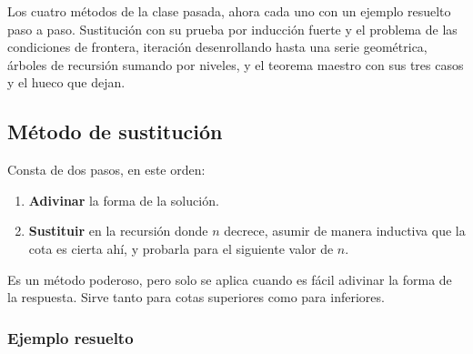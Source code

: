 \documentclass[11pt,letterpaper]{article}
\begin{document}
\newpage



\begin{quick_sum}
  Los cuatro métodos de la clase pasada, ahora cada uno con un ejemplo
  resuelto paso a paso. Sustitución con su prueba por inducción fuerte
  y el problema de las condiciones de frontera, iteración desenrollando
  hasta una serie geométrica, árboles de recursión sumando por niveles,
  y el teorema maestro con sus tres casos y el hueco que dejan.
\end{quick_sum}


\subsection*{Método de sustitución}

Consta de dos pasos, en este orden:

\begin{enumerate}[itemsep=0.2em]
  \item \textbf{Adivinar} la forma de la solución.
  \item \textbf{Sustituir} en la recursión donde $n$ decrece, asumir
        de manera inductiva que la cota es cierta ahí, y probarla para
        el siguiente valor de $n$.
\end{enumerate}

Es un método poderoso, pero solo se aplica cuando es fácil adivinar la
forma de la respuesta. Sirve tanto para cotas superiores como para
inferiores.

\subsubsection*{Ejemplo resuelto}
\end{document}
